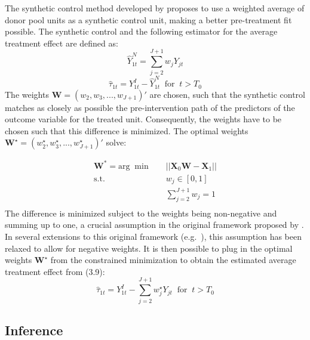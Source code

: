 \documentclass{scrbook}
\begin{document}
The synthetic control method developed by
\textcite{abadie_economic_2003} proposes to use a weighted average of
donor pool units as a synthetic control unit, making a better
pre-treatment fit possible. The synthetic control and the following
estimator for the average treatment effect are defined as:
\begin{equation}
\hat{Y}_{1t}^{N}=\sum_{j=2}^{J+1} w_{j}Y_{jt}
\end{equation} \begin{equation}
\hat{\tau}_{1t}=Y_{1t}^{I}-\hat{Y}_{1t}^{N}\; \; \text{for}\; \; t>T_{0}
\end{equation} The weights \(\mathbf{W}=(w_{2},w_{3},...,w_{J+1})'\) are
chosen, such that the synthetic control matches as closely as possible
the pre-intervention path of the predictors of the outcome variable for
the treated unit. Consequently, the weights have to be chosen such that
this difference is minimized. The optimal weights
\(\mathbf{W}^{\star}=(w_{2}^{\star},w_{3}^{\star},...,w_{J+1}^{\star})'\)
solve:

\begin{equation}   
\begin{aligned}
\mathbf{W}^{*}=\text{arg}\; \min \quad & \vert\vert\mathbf{X}_{0}\mathbf{W}-\mathbf{X}_{1}\vert\vert\\
\textrm{s.t.} \quad & w_{j}\in[0,1]\\
  &\sum_{j=2}^{J+1} w_{j}=1   \\
\end{aligned}
\end{equation} The difference is minimized subject to the weights being
non-negative and summing up to one, a crucial assumption in the original
framework proposed by \textcite{abadie_economic_2003}. In several
extensions to this original framework
(e.g.~\textcite{doudchenko_balancing_2016}), this assumption has been
relaxed to allow for negative weights. It is then possible to plug in
the optimal weights \(\mathbf{W}^{\star}\) from the constrained
minimization to obtain the estimated average treatment effect from
(3.9): \begin{equation}
\hat{\tau}_{1t}=Y_{1t}^{I}-\sum_{j=2}^{J+1} w_{j}^{\star}Y_{jt}\; \; \text{for}\; \; t>T_{0}
\end{equation}

\subsection*{Inference}
\end{document}
